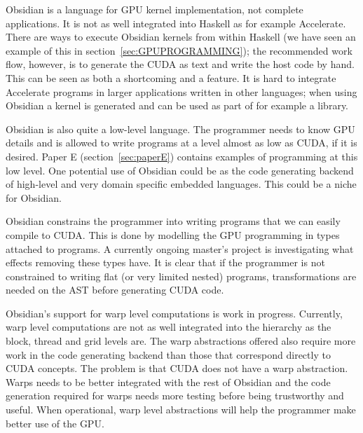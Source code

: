 \documentclass[a4paper]{book}
\begin{document}
Obsidian is a language for GPU kernel implementation, not complete applications. 
It is not as well integrated into Haskell as for example Accelerate. There are 
ways to execute Obsidian kernels from within Haskell (we have seen an example of this in 
section~\ref{sec:GPUPROGRAMMING}); the recommended work flow, 
however, is to generate the CUDA as text and write the host code by hand. This 
can be seen as both a shortcoming and a feature. It is hard to integrate 
Accelerate programs in larger applications written in other languages; when 
using Obsidian a kernel is generated and can be used as part of for example a library. 

Obsidian is also quite a low-level language. The programmer needs to know GPU details 
and is allowed to write programs at a level almost as low as CUDA, if it is desired. 
Paper E (section~\ref{sec:paperE}) contains examples of programming at this low level. 
One potential use of Obsidian could be as the code generating backend of high-level 
and very domain specific embedded languages. This could be a niche for Obsidian.  

Obsidian constrains the programmer into writing programs that we can easily compile to 
CUDA. This is done by modelling the GPU programming in types attached to programs. A 
currently ongoing master's project is investigating what effects removing these 
types have. It is clear that if the programmer is not constrained to writing flat 
(or very limited nested) programs, transformations are needed on the AST before 
generating CUDA code. 

Obsidian's support for warp level computations is work in progress. Currently, warp level 
computations are not as well integrated into the hierarchy as the block, thread and grid 
levels are. The warp abstractions 
offered also require more work in the code generating backend than those 
that correspond directly to CUDA concepts. The problem is that CUDA does not have 
a warp abstraction. Warps needs to be better integrated with the rest of Obsidian 
and the code generation required for warps needs more testing before being 
trustworthy and useful. When operational, warp level abstractions will help 
the programmer make better use of the GPU. 



%
%
\end{document}

